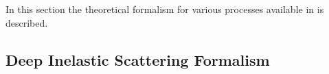 

%
In this section the theoretical formalism for various processes available in \fitter is described.



\subsection{Deep Inelastic Scattering Formalism}
\label{dissection}


